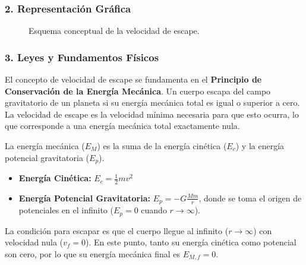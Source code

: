 \subsubsection*{2. Representación Gráfica}
\begin{figure}[H]
    \centering
    \caption{Esquema conceptual de la velocidad de escape.}
\end{figure}

\subsubsection*{3. Leyes y Fundamentos Físicos}
El concepto de velocidad de escape se fundamenta en el \textbf{Principio de Conservación de la Energía Mecánica}. Un cuerpo escapa del campo gravitatorio de un planeta si su energía mecánica total es igual o superior a cero. La velocidad de escape es la velocidad mínima necesaria para que esto ocurra, lo que corresponde a una energía mecánica total exactamente nula.

La energía mecánica ($E_M$) es la suma de la energía cinética ($E_c$) y la energía potencial gravitatoria ($E_p$).
\begin{itemize}
    \item \textbf{Energía Cinética:} $E_c = \frac{1}{2} m v^2$
    \item \textbf{Energía Potencial Gravitatoria:} $E_p = -G \frac{M m}{r}$, donde se toma el origen de potenciales en el infinito ($E_p=0$ cuando $r \to \infty$).
\end{itemize}
La condición para escapar es que el cuerpo llegue al infinito ($r \to \infty$) con velocidad nula ($v_f=0$). En este punto, tanto su energía cinética como potencial son cero, por lo que su energía mecánica final es $E_{M,f} = 0$.

